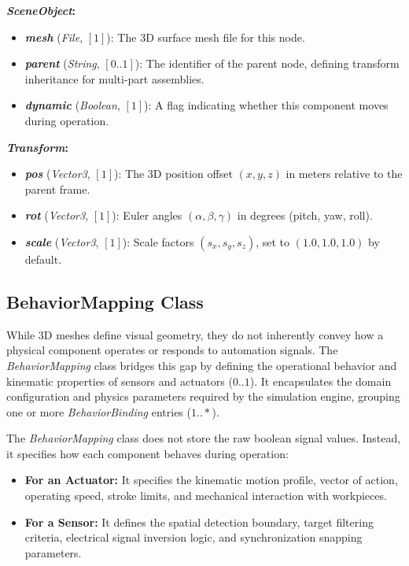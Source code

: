 \textbf{\textit{SceneObject}:}
\begin{itemize}
    \item \textbf{\textit{mesh}} (\textit{File}, $[1]$): The 3D surface mesh file for this node.
    \item \textbf{\textit{parent}} (\textit{String}, $[0..1]$): The identifier of the parent node, defining transform inheritance for multi-part assemblies.
    \item \textbf{\textit{dynamic}} (\textit{Boolean}, $[1]$): A flag indicating whether this component moves during operation.
\end{itemize}

\textbf{\textit{Transform}:}
\begin{itemize}
    \item \textbf{\textit{pos}} (\textit{Vector3}, $[1]$): The 3D position offset $(x, y, z)$ in meters relative to the parent frame.
    \item \textbf{\textit{rot}} (\textit{Vector3}, $[1]$): Euler angles $(\alpha, \beta, \gamma)$ in degrees (pitch, yaw, roll).
    \item \textbf{\textit{scale}} (\textit{Vector3}, $[1]$): Scale factors $(s_x, s_y, s_z)$, set to $(1.0, 1.0, 1.0)$ by default.
\end{itemize}

\subsection{BehaviorMapping Class}
\label{sec:model_behavior_mapping}

While 3D meshes define visual geometry, they do not inherently convey how a physical component operates or responds to automation signals. The \textit{BehaviorMapping} class bridges this gap by defining the operational behavior and kinematic properties of sensors and actuators ($0..1$). It encapsulates the domain configuration and physics parameters required by the simulation engine, grouping one or more \textit{BehaviorBinding} entries ($1..*$). 

The \textit{BehaviorMapping} class does not store the raw boolean signal values. Instead, it specifies how each component behaves during operation:
\begin{itemize}
    \item \textbf{For an Actuator:} It specifies the kinematic motion profile, vector of action, operating speed, stroke limits, and mechanical interaction with workpieces.
    \item \textbf{For a Sensor:} It defines the spatial detection boundary, target filtering criteria, electrical signal inversion logic, and synchronization snapping parameters.
\end{itemize}

